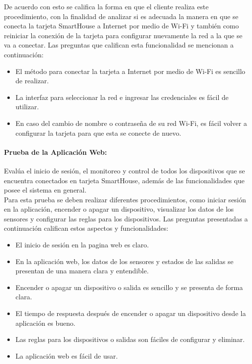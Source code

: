 De acuerdo con esto se califica la forma en que el cliente realiza este procedimiento, con la finalidad de analizar si es adecuada la manera en que se conecta la tarjeta SmartHouse a Internet por medio de Wi-Fi y también como reiniciar la conexión de la tarjeta para configurar nuevamente la red a la que se va a conectar. Las preguntas que califican esta funcionalidad se mencionan a continuación:\\

\begin{itemize}
\item El método para conectar la tarjeta a Internet por medio de Wi-Fi es sencillo de realizar.
\item La interfaz para seleccionar la red e ingresar las credenciales es fácil de utilizar.
\item En caso del cambio de nombre o contraseña de su red Wi-Fi, es fácil volver a configurar la tarjeta para que esta se conecte de nuevo.
\end{itemize}

\paragraph{Prueba de la Aplicación Web:} Evalúa el inicio de sesión, el monitoreo y control de todos los dispositivos que se encuentra conectados en tarjeta SmartHouse, además de las funcionalidades que posee el sistema en general.\\

Para esta prueba se deben realizar diferentes procedimientos, como iniciar sesión en la aplicación, encender o apagar un dispositivo, visualizar los datos de los sensores y configurar las reglas para los dispositivos. Las preguntas presentadas a continuación califican estos aspectos y funcionalidades:\\

\begin{itemize}
	\item El inicio de sesión en la pagina web es claro.
	\item En la aplicación web, los datos de los sensores y estados de las salidas se presentan de una manera clara y entendible.
	\item Encender o apagar un dispositivo o salida es sencillo y se presenta de forma clara.
	\item El tiempo de respuesta después de encender o apagar un dispositivo desde la aplicación es bueno.
	\item Las reglas para los dispositivos o salidas son fáciles de configurar y eliminar.
	\item La aplicación web es fácil de usar.
\end{itemize}

